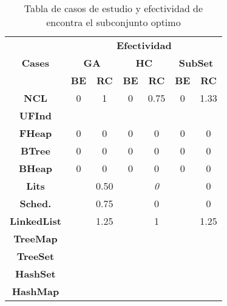 \begin{table}[t]
\centering
\label{tab:t1}
\scriptsize
\begin{tabular}{|c c|cc|cc|cc|}
\midrule
\multicolumn{2}{|c|}{\multirow{3}{*}{\textbf{Cases}}} & \multicolumn{6}{c|}{\textbf{Efectividad}} \\
\cline{3-8}
\multicolumn{2}{|c|}{} & \multicolumn{2}{c}{\textbf{GA}} & \multicolumn{2}{c}{\textbf{HC}} & \multicolumn{2}{c|}{\textbf{SubSet}} \\
\multicolumn{2}{|c|}{} & \textbf{\tiny{BE}} & \textbf{\tiny{RC}} & \textbf{\tiny{BE}} & \textbf{\tiny{RC}} & \textbf{\tiny{BE}} & \textbf{\tiny{RC}} \\
\midrule
\multicolumn{2}{|c|}{\textbf{NCL}} & 0  &  1 & 0 &  0.75 &0 &  1.33 \\
\midrule
\multicolumn{2}{|c|}{\textbf{UFInd}}&   &   &   &   &   &      \\
\midrule

\multicolumn{2}{|c|}{\textbf{FHeap}}& 0 & 0  &  0 &  0 &  0 &  0   \\
\midrule

\multicolumn{2}{|c|}{\textbf{BTree}} & 0 & 0  &  0 &  0 &  0 &  0  \\
\midrule

\multicolumn{2}{|c|}{\textbf{BHeap}}& 0 & 0  &  0 &  0 &  0 &  0   \\
\midrule

\multicolumn{2}{|c|}{\textbf{Lits}} &   & 0.50  &   & \emph{0}  &   & 0   \\
\midrule

\multicolumn{2}{|c|}{\textbf{Sched.}} &   & 0.75   &   &  0 &   & 0   \\

\midrule
\multicolumn{2}{|c|}{\textbf{LinkedList}} &  &  1.25 &   &  1 &  &  1.25  \\
\midrule

\multicolumn{2}{|c|}{\textbf{TreeMap}} &   &   &   &   &   &     \\
\midrule

\multicolumn{2}{|c|}{\textbf{TreeSet}} &   &   &   &   &   &    \\
\midrule

\multicolumn{2}{|c|}{\textbf{HashSet}} &   &   &   &   &   &    \\
\midrule

\multicolumn{2}{|c|}{\textbf{HashMap}} &   &   &   &   &   &    \\
\hline
\end{tabular}

\caption{Tabla de casos de estudio y efectividad de encontra el subconjunto optimo}
\label{tab:efectividad}
\end{table}

